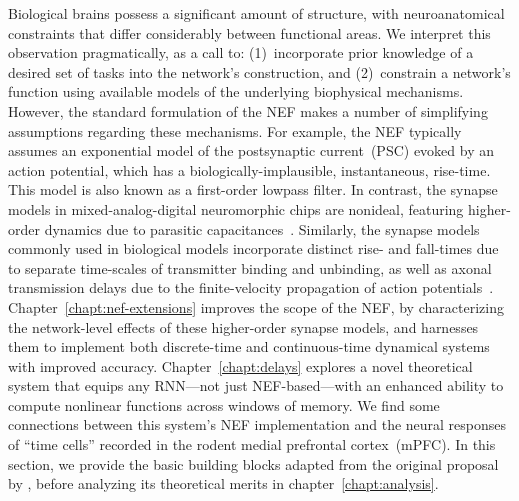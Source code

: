 Biological brains possess a significant amount of structure, with neuroanatomical constraints that differ considerably between functional areas. %
We interpret this observation pragmatically, as a call to: (1)~incorporate prior knowledge of a desired set of tasks into the network's construction, and (2)~constrain a network's function using available models of the underlying biophysical mechanisms.
However, the standard formulation of the NEF makes a number of simplifying assumptions regarding these mechanisms.
For example, the NEF typically assumes an exponential model of the postsynaptic current~(PSC) evoked by an action potential, which has a biologically-implausible, instantaneous, rise-time.
This model is also known as a first-order lowpass filter.
In contrast, the synapse models in mixed-analog-digital neuromorphic chips are nonideal, featuring higher-order dynamics due to parasitic capacitances~\citep{voelker2017iscas}.
Similarly, the synapse models commonly used in biological models incorporate distinct rise- and fall-times due to separate time-scales of transmitter binding and unbinding, as well as axonal transmission delays due to the finite-velocity propagation of action potentials~\citep{roth2009modeling}.
Chapter~\ref{chapt:nef-extensions} improves the scope of the NEF, by characterizing the network-level effects of these higher-order synapse models, and harnesses them to implement both discrete-time and continuous-time dynamical systems with improved accuracy.
Chapter~\ref{chapt:delays} explores a novel theoretical system that equips any RNN---not just NEF-based---with an enhanced ability to compute nonlinear functions across windows of memory.
We find some connections between this system's NEF implementation and the neural responses of ``time cells'' recorded in the rodent medial prefrontal cortex~(mPFC).
In this section, we provide the basic building blocks adapted from the original proposal by \citet{eliasmith2003a}, before analyzing its theoretical merits in chapter~\ref{chapt:analysis}.

